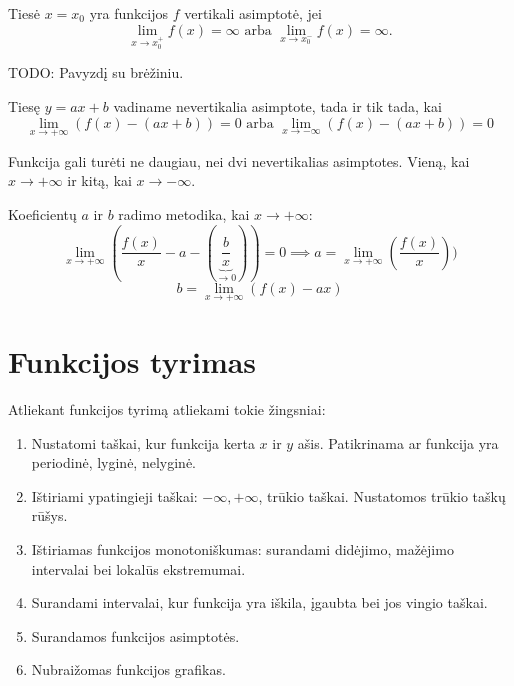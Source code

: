 \begin{defn}
  Tiesė $x = x_{0}$ yra funkcijos $f$ vertikali asimptotė, jei 
  \begin{equation*}
    \lim_{x \to x_{0}^{+}} f(x) = \infty \text{ arba }
    \lim_{x \to x_{0}^{-}} f(x) = \infty.
  \end{equation*}

  TODO: Pavyzdį su brėžiniu.
\end{defn}

\begin{defn}
  Tiesę $y = ax + b$ vadiname nevertikalia asimptote, tada ir tik tada, kai
  \begin{equation*}
    \lim_{x \to +\infty} (f(x) - (ax + b)) = 0 \text{ arba }
    \lim_{x \to -\infty} (f(x) - (ax + b)) = 0
  \end{equation*}

  \begin{note}
    Funkcija gali turėti ne daugiau, nei dvi nevertikalias asimptotes. 
    Vieną, kai $x \to +\infty$ ir kitą, kai $x \to -\infty$.
  \end{note}

  \begin{note}
    Koeficientų $a$ ir $b$ radimo metodika, kai $x \to +\infty$:
    \begin{equation*}
      \lim_{x \to +\infty} \left( \frac{f(x)}{x} - a - 
        \left( \underbrace{\frac{b}{x}}_{\to 0} \right) \right) = 0
        \implies a = \lim_{x \to +\infty} \left( \frac{f(x)}{x} \right))
    \end{equation*}
    \begin{equation*}
      b = \lim_{x \to +\infty} (f(x) - ax)
    \end{equation*}
  \end{note}
\end{defn}

\section{Funkcijos tyrimas}

Atliekant funkcijos tyrimą atliekami tokie žingsniai:
\begin{enumerate}
  \item Nustatomi taškai, kur funkcija kerta $x$ ir $y$ ašis. Patikrinama
    ar funkcija yra periodinė, lyginė, nelyginė.
  \item Ištiriami ypatingieji taškai: $-\infty, +\infty$, trūkio taškai.
    Nustatomos trūkio taškų rūšys.
  \item Ištiriamas funkcijos monotoniškumas: surandami didėjimo, mažėjimo
    intervalai bei lokalūs ekstremumai.
  \item Surandami intervalai, kur funkcija yra iškila, įgaubta bei jos
    vingio taškai.
  \item Surandamos funkcijos asimptotės.
  \item Nubraižomas funkcijos grafikas.
\end{enumerate}
